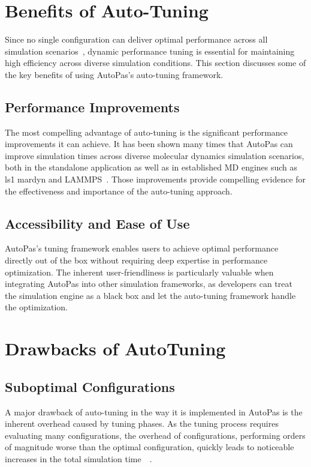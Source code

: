 \documentclass[conference]{IEEEtran}
\begin{document}
\section{Benefits of Auto-Tuning}

Since no single configuration can deliver optimal performance across all simulation scenarios~\cite{Tchipev2020}, dynamic performance tuning is essential for maintaining high efficiency across diverse simulation conditions. This section discusses some of the key benefits of using AutoPas's auto-tuning framework.

\subsection*{Performance Improvements}

The most compelling advantage of auto-tuning is the significant performance improvements it can achieve. It has been shown many times that AutoPas can improve simulation times across diverse molecular dynamics simulation scenarios, both in the standalone application as well as in established MD engines such as ls1 mardyn and LAMMPS~\cite{SECKLER2021101296}\cite{Gratl2022AutoPas}. Those improvements provide compelling evidence for the effectiveness and importance of the auto-tuning approach.

\subsection*{Accessibility and Ease of Use}

AutoPas's tuning framework enables users to achieve optimal performance directly out of the box without requiring deep expertise in performance optimization. The inherent user-friendliness is particularly valuable when integrating AutoPas into other simulation frameworks, as developers can treat the simulation engine as a black box and let the auto-tuning framework handle the optimization.

\section{Drawbacks of AutoTuning}

\subsection*{Suboptimal Configurations}

A major drawback of auto-tuning in the way it is implemented in AutoPas is the inherent overhead caused by tuning phases. As the tuning process requires evaluating many configurations, the overhead of configurations, performing orders of magnitude worse than the optimal configuration, quickly leads to noticeable increases in the total simulation time~\cite{endreport.pdf}~\cite{Manuel_Lerchner_Thesis.pdf}.
\end{document}
